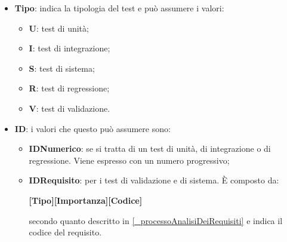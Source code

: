 \begin{itemize}
    \item \textbf{Tipo}: indica la tipologia del test e può assumere i valori:
    \begin{itemize}
        \item \textbf{U}: test di unità;
        \item \textbf{I}: test di integrazione;
        \item \textbf{S}: test di sistema;
        \item \textbf{R}: test di regressione;
        \item \textbf{V}: test di validazione.
    \end{itemize}
    \item \textbf{ID}: i valori che questo può assumere sono:
    \begin{itemize}
        \item \textbf{IDNumerico}: se si tratta di un test di unità, di integrazione o di regressione. Viene espresso con un numero progressivo;
        \item \textbf{IDRequisito}: per i test di validazione e di sistema. È composto da:
        \begin{center}
            \textbf{[Tipo][Importanza][Codice]} 
        \end{center}
        secondo quanto descritto in \ref{_processoAnalisiDeiRequisiti} e indica il codice del requisito.
    \end{itemize}
\end{itemize}
